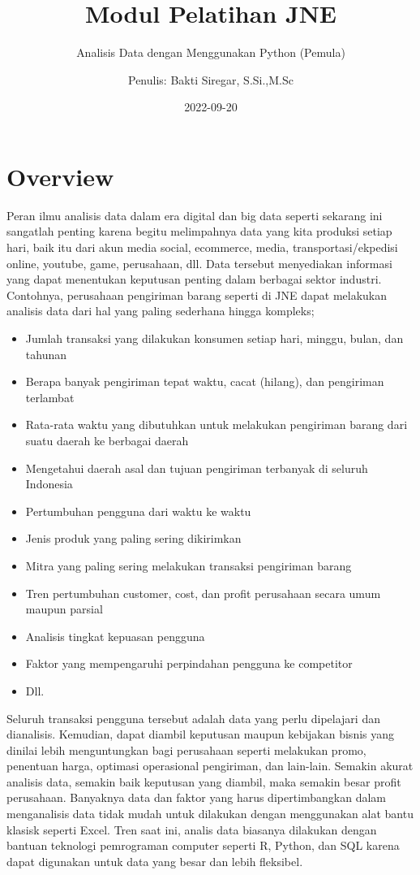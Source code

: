 \documentclass[
]{docs}
\title{Modul Pelatihan JNE}
\subtitle{Analisis Data dengan Menggunakan Python (Pemula)}
\author{Penulis: Bakti Siregar, S.Si.,M.Sc}
\date{2022-09-20}
\providecommand{\tightlist}{%
  \setlength{\itemsep}{0pt}\setlength{\parskip}{0pt}}
\begin{document}
\maketitle

{
\setcounter{tocdepth}{2}
\tableofcontents
}
\hypertarget{overview}{%
\section*{Overview}\label{overview}}

Peran ilmu analisis data dalam era digital dan big data seperti sekarang ini sangatlah penting karena begitu melimpahnya data yang kita produksi setiap hari, baik itu dari akun media social, ecommerce, media, transportasi/ekpedisi online, youtube, game, perusahaan, dll. Data tersebut menyediakan informasi yang dapat menentukan keputusan penting dalam berbagai sektor industri. Contohnya, perusahaan pengiriman barang seperti di JNE dapat melakukan analisis data dari hal yang paling sederhana hingga kompleks;

\begin{itemize}
\tightlist
\item
  Jumlah transaksi yang dilakukan konsumen setiap hari, minggu, bulan, dan tahunan
\item
  Berapa banyak pengiriman tepat waktu, cacat (hilang), dan pengiriman terlambat
\item
  Rata-rata waktu yang dibutuhkan untuk melakukan pengiriman barang dari suatu daerah ke berbagai daerah
\item
  Mengetahui daerah asal dan tujuan pengiriman terbanyak di seluruh Indonesia
\item
  Pertumbuhan pengguna dari waktu ke waktu
\item
  Jenis produk yang paling sering dikirimkan
\item
  Mitra yang paling sering melakukan transaksi pengiriman barang
\item
  Tren pertumbuhan customer, cost, dan profit perusahaan secara umum maupun parsial
\item
  Analisis tingkat kepuasan pengguna
\item
  Faktor yang mempengaruhi perpindahan pengguna ke competitor
\item
  Dll.
\end{itemize}

Seluruh transaksi pengguna tersebut adalah data yang perlu dipelajari dan dianalisis. Kemudian, dapat diambil keputusan maupun kebijakan bisnis yang dinilai lebih menguntungkan bagi perusahaan seperti melakukan promo, penentuan harga, optimasi operasional pengiriman, dan lain-lain. Semakin akurat analisis data, semakin baik keputusan yang diambil, maka semakin besar profit perusahaan. Banyaknya data dan faktor yang harus dipertimbangkan dalam menganalisis data tidak mudah untuk dilakukan dengan menggunakan alat bantu klasisk seperti Excel. Tren saat ini, analis data biasanya dilakukan dengan bantuan teknologi pemrograman computer seperti R, Python, dan SQL karena dapat digunakan untuk data yang besar dan lebih fleksibel.
\end{document}
